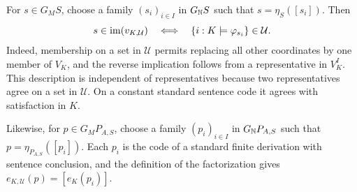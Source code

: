 For $s\in G_MS$, choose a family $(s_i)_{i\in I}$ in
$G_{\mathbb N}S$ such that $s=\eta_S([s_i])$.
Then
\[
 s\in\operatorname{im}(v_{K,\mathcal U})
 \quad\Longleftrightarrow\quad
 \{i:K\models\varphi_{s_i}\}\in\mathcal U.
\]
Indeed, membership on a set in $\mathcal U$ permits replacing
all other coordinates by one member of $V_K$, and the reverse
implication follows from a representative in $V_K^I$.
This description is independent of representatives because two
representatives agree on a set in $\mathcal U$. On a constant
standard sentence code it agrees with satisfaction in $K$.

Likewise, for $p\in G_MP_{A,S}$, choose a family $(p_i)_{i\in I}$
in $G_{\mathbb N}P_{A,S}$ such that $p=\eta_{P_{A,S}}([p_i])$.
Each $p_i$ is the code of a standard finite derivation with sentence conclusion,
and the definition of the factorization gives
$e_{K,\mathcal U}(p)=[e_K(p_i)]$.
